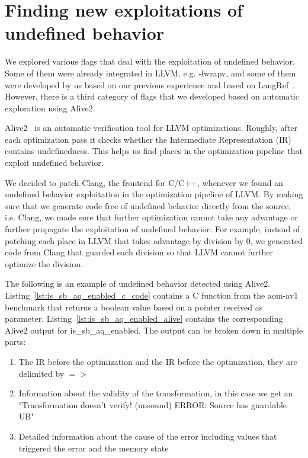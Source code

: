 \section{Finding new exploitations of undefined behavior}

We explored various flags that deal with the exploitation of undefined behavior.
Some of them were already integrated in LLVM, e.g. -fwrapv, and some of them were
developed by us based on our previous experience and based on
LangRef~\cite{langref}. However, there is a third category of flags that we
developed based on automatic exploration using Alive2.

Alive2~\cite{lopes2021alive2} is an automatic verification tool for LLVM
optimizations. Roughly, after each optimization pass it checks whether the
Intermediate Representation (IR) contains undefinedness. This helps us find
places in the optimization pipeline that exploit undefined behavior.

We decided to patch Clang, the frontend for C/C++, whenever we found an
undefined behavior exploitation in the optimization pipeline of LLVM. By making
sure that we generate code free of undefined behavior directly from the source,
i.e.  Clang, we made sure that further optimization cannot take any advantage or
further propagate the exploitation of undefined behavior. For example, instead
of patching each place in LLVM that takes advantage by division by 0, we
generated code from Clang that guarded each division so that LLVM cannot further
optimize the division.


The following is an example of undefined behavior detected using Alive2.
Listing~\ref{lst:is_sb_aq_enabled_c_code} contains a C function from the
aom-av1~\cite{aomav1benchmark} benchmark that returns a boolean value based on a
pointer received as parameter. Listing~\ref{lst:is_sb_aq_enabled_alive} contains
the corresponding Alive2 output for is_sb_aq_enabled. The output can be broken
down in multiple parts:

\begin{enumerate}
  \item The IR before the optimization and the IR before the optimization, they
are delimited by \(=>\)
  \item Information about the validity of the transformation, in this case we
get an "Transformation doesn't verify! (unsound) ERROR: Source has guardable UB"
  \item Detailed information about the cause of the error including values that
triggered the error and the memory state
\end{enumerate}

